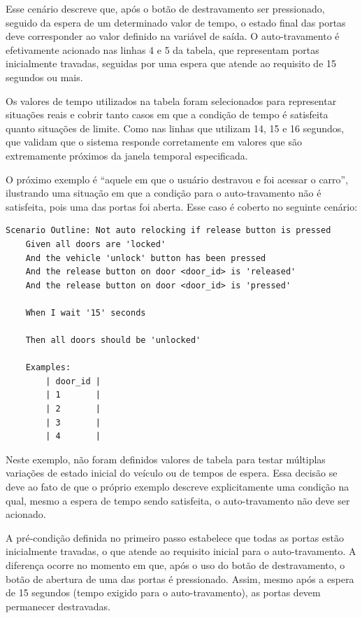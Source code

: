 Esse cenário descreve que, após o botão de destravamento ser pressionado, seguido da espera de um determinado valor de tempo, o estado final das 
portas deve corresponder ao valor definido na variável de saída. O auto-travamento é efetivamente acionado nas linhas 4 e 5 da tabela, que representam 
portas inicialmente travadas, seguidas por uma espera que atende ao requisito de 15 segundos ou mais. 

Os valores de tempo utilizados na tabela foram selecionados para representar situações reais e cobrir tanto casos em que a condição de tempo é satisfeita 
quanto situações de limite. Como nas linhas que utilizam 14, 15 e 16 segundos, que validam que o sistema responde corretamente em valores que são extremamente 
próximos da janela temporal especificada.

O próximo exemplo é ``aquele em que o usuário destravou e foi acessar o carro'', ilustrando uma situação em que a condição para o auto-travamento não é satisfeita, 
pois uma das portas foi aberta. Esse caso é coberto no seguinte cenário:

\begin{verbatim}
Scenario Outline: Not auto relocking if release button is pressed
    Given all doors are 'locked'
    And the vehicle 'unlock' button has been pressed
    And the release button on door <door_id> is 'released'
    And the release button on door <door_id> is 'pressed'

    When I wait '15' seconds

    Then all doors should be 'unlocked'

    Examples:
        | door_id |
        | 1       |
        | 2       |
        | 3       |
        | 4       |
\end{verbatim}

Neste exemplo, não foram definidos valores de tabela para testar múltiplas variações de estado inicial do veículo ou de tempos de espera. Essa decisão se deve ao 
fato de que o próprio exemplo descreve explicitamente uma condição na qual, mesmo a espera de tempo sendo satisfeita, o auto-travamento não deve ser acionado.

A pré-condição definida no primeiro passo estabelece que todas as portas estão inicialmente travadas, o que atende ao requisito inicial para o auto-travamento. 
A diferença ocorre no momento em que, após o uso do botão de destravamento, o botão de abertura de uma das portas é pressionado. Assim, mesmo após a espera de 
15 segundos (tempo exigido para o auto-travamento), as portas devem permanecer destravadas.

